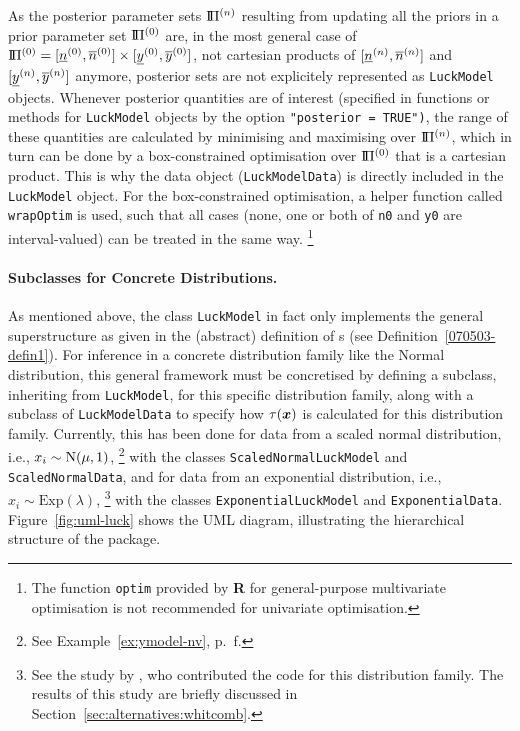 As the posterior parameter sets $\text{I}\!\Pi^{(n)}$ resulting from updating all the priors in a
prior parameter set $\text{I}\!\Pi^{(0)}$ are, in the most general case of $\text{I}\!\Pi^{(0)} = [\underline{n}^{(0)},\overline{n}^{(0)}] \times [\underline{y}^{(0)}, \overline{y}^{(0)}]$,
not cartesian products of $[\underline{n}^{(n)}, \overline{n}^{(n)}]$ and $[\underline{y}^{(n)}, \overline{y}^{(n)}]$ anymore, posterior sets are not
explicitely represented as \texttt{LuckModel} objects. Whenever posterior quantities
are of interest (specified in functions or methods for \texttt{LuckModel} objects by the option \texttt{"posterior = TRUE")},
the range of these quantities are calculated by minimising and maximising over $\text{I}\!\Pi^{(n)}$, %
which in turn can be done by a box-constrained optimisation over $\text{I}\!\Pi^{(0)}$ %
that is a cartesian product.
This is why the data object (\texttt{LuckModelData}) is directly included in the \texttt{LuckModel} object.
For the box-constrained optimisation, a helper function called \texttt{wrapOptim} is used,
such that all cases (none, one or both of \texttt{n0} and \texttt{y0} %
are interval-valued) can be treated in the same way.%
\footnote{The function \texttt{optim} provided by \textbf{R} for general-purpose
multivariate optimisation is not recommended for univariate optimisation.}

\paragraph{Subclasses for Concrete Distributions.}

As mentioned above, the class \texttt{LuckModel} in fact only implements the general superstructure as given in the
(abstract) definition of \model s (see Definition~\ref{070503-defin1}).
For inference in a concrete distribution family like the Normal distribution,
this general framework must be concretised %
by defining a subclass, inheriting from \texttt{LuckModel},
for this specific distribution family,
along with a subclass of \texttt{LuckModelData} to specify how $\tau({\bm x})$
is calculated for this distribution family.
Currently, this has been done for data from a scaled normal distribution,
i.e., $x_i \sim \operatorname{N}(\mu, 1)$,%
\footnote{See Example~\ref{ex:ymodel-nv}, p.~\pageref{ex:ymodel-nv}f.}
with the classes \texttt{ScaledNormalLuckModel} and \texttt{ScaledNormalData},
and for data from an exponential distribution, i.e., $x_i \sim \text{Exp}(\lambda)$,%
\footnote{See the study by \textcite{2011:krautenbacher},
who contributed the code for this distribution family.
The results of this study are briefly discussed in Section~\ref{sec:alternatives:whitcomb}.}
with the classes \texttt{ExponentialLuckModel} and \texttt{ExponentialData}.
Figure~\ref{fig:uml-luck} shows the UML diagram,
illustrating the hierarchical structure of the package. 

